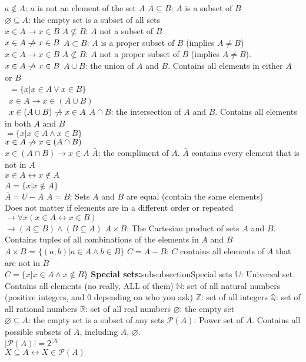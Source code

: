 \documentclass{article}
\newcommand{\upspace}{\vspace{0px}}
\newcommand{\bksp}{\hspace{-3px}}
\newcommand{\zza}[1]{\upspace \1\bksp\textbf{#1:}{subsubsection}{#1}}
\newcommand{\aaa}{\upspace \1\bksp}
\newcommand{\bbb}{\upspace \2\bksp}
\renewcommand{\iff}{\leftrightarrow}
\renewcommand{\implies}{\rightarrow}
\begin{document}
\begin{multicols*}{2}
\begin{outline}[compactitem]
	\aaa $a \notin A$: $a$ is not an element of the set $A$
	\aaa $A \subseteq B  $:  $A$ is a subset of $B$
		\\ $\varnothing \subseteq A$: the empty set is a subset of all sets
		\\ $x \in A \implies x \in B$
	\aaa $A \nsubseteq B $:  $A$ not a subset of $B$
		\\ $x \in A \centernot\implies x \in B$
	\aaa $A \subset B    $:  $A$ is a proper subset of $B$ (implies $A\ne B$)
		\\ $x \in A \implies x \in B$
	\aaa $A \not\subset B$:  $A$ not a proper subset of $B$ (implies $A\ne B$).
		\\ $x \in A \centernot\implies x \in B$
	\aaa $A \cup B$: the union of $A$ and $B$. Contains all elements in either $A$ or $B$
		\\\ $= \{x|x \in A \vee x \in B\}$
		\\\ $x \in A \implies x \in (A \cup B)$
		\\\ $x \in (A \cup B) \centernot\implies x \in A $
	\aaa $A \cap B$: the intersection of $A$ and $B$. Contains all elements in both $A$ and $B$
		\\ $= \{x|x \in A \wedge x \in B\}$
		\\ $x \in A \centernot\implies x \in (A \cap B)$
		\\ $x \in (A \cap B) \implies x \in A $
	\aaa $\bar{A}$: the compliment of $A$. $\bar{A}$ contains every element that is not in $A$
		\\ $x \in \bar{A} \iff x \notin A$
		\\ $\bar{A} = \{x | x \notin A \}$
		\\ $\bar{A} = U - A$
	\aaa $A=B$: Sets $A$ and $B$ are equal (contain the same elements)
		\\ Does not matter if elements are in a different order or repeated
		\\ $\implies \forall x (x \in A \leftrightarrow x \in B)$
		\\ $\implies (A \subseteq B) \wedge (B \subseteq A)$
	\aaa $A \times B$: The Cartesian product of sets $A$ and $B$. Contains tuples of all combinations of the elements in $A$ and $B$
		\\ $A \times B$ = $\{(a,b) | a \in A \wedge b \in B\}$
	\aaa $C = A - B$:  $C$ contains all elements of $A$ that are not in $B$
		\\ $C = \{x|x \in A \wedge x \notin B \}$
	\zza{Special sets}
		\bbb $\mathbb{U}$: Universal set. Contains all elements (no really, ALL of them)
		\bbb $\mathbb{N}$: set of all natural numbers (positive integers, and 0 depending on who you ask)
		\bbb $\mathbb{Z}$: set of all integers
		\bbb $\mathbb{Q}$: set of all rational numbers
		\bbb $\mathbb{R}$: set of all real numbers
		\bbb $\varnothing$: the empty set
			\\ $\varnothing \subseteq A$: the empty set is a subset of any sets
		\bbb $\mathcal{P}(A)$: Power set of $A$. Contains all possible subsets of $A$, including $A$, $\varnothing$.
			\\ $|\mathcal{P}(A)| = 2^{|A|}$
			\\ $X \subseteq A \iff X \in \mathcal{P}(A)$


\end{outline}
\end{multicols*}
\end{document}

